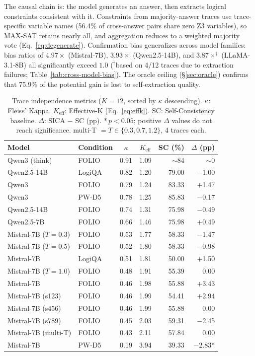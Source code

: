 The causal chain is: the model generates an answer, then extracts logical constraints consistent with it. Constraints from majority-answer traces use trace-specific variable names (56.4\% of cross-answer pairs share zero Z3 variables), so MAX-SAT retains nearly all, and aggregation reduces to a weighted majority vote (Eq.~\ref{eq:degenerate}). Confirmation bias generalizes across model families: bias ratios of $4.97\times$ (Mistral-7B), $3.93\times$ (Qwen2.5-14B), and $3.87{\times}^{\dag}$ (LLaMA-3.1-8B) all significantly exceed $1.0$ ($^{\dag}$based on 4/12 traces due to extraction failures; Table~\ref{tab:cross-model-bias}). The oracle ceiling (\S\ref{sec:oracle}) confirms that 75.9\% of the potential gain is lost to self-extraction quality.

\begin{table}[t]
\centering
\small
\caption{Trace independence metrics ($K = 12$, sorted by $\kappa$ descending). $\kappa$: Fleiss' Kappa. $K_{\text{eff}}$: Effective-K (Eq.~\ref{eq:effk}). SC: Self-Consistency baseline. $\Delta$: SICA $-$ SC (pp). {*}\,$p < 0.05$; positive $\Delta$ values do not reach significance. multi-T $= T \in \{0.3, 0.7, 1.2\}$, 4 traces each.}
\label{tab:independence}
\begin{tabular}{@{}llccrr@{}}
\toprule
Model & Condition & $\kappa$ & $K_{\text{eff}}$ & SC (\%) & $\Delta$ (pp) \\
\midrule
Qwen3 (think) & FOLIO & 0.91 & 1.09 & ${\sim}$84 & ${\sim}$0 \\
Qwen2.5-14B & LogiQA & 0.82 & 1.20 & 79.00 & $-$1.00 \\
Qwen3 & FOLIO & 0.79 & 1.24 & 83.33 & $+$1.47 \\
Qwen3 & PW-D5 & 0.78 & 1.25 & 85.83 & $-$0.17 \\
Qwen2.5-14B & FOLIO & 0.74 & 1.31 & 75.98 & $-$0.49 \\
Qwen2.5-7B & FOLIO & 0.66 & 1.46 & 75.98 & $+$0.49 \\
\addlinespace
Mistral-7B ($T{=}0.3$) & FOLIO & 0.53 & 1.77 & 58.33 & $-$1.47 \\
Mistral-7B ($T{=}0.5$) & FOLIO & 0.52 & 1.80 & 58.33 & $-$0.98 \\
Mistral-7B & LogiQA & 0.51 & 1.81 & 50.00 & $+$1.50 \\
Mistral-7B ($T{=}1.0$) & FOLIO & 0.48 & 1.91 & 55.39 & 0.00 \\
Mistral-7B & FOLIO & 0.46 & 1.98 & 55.88 & $+$3.43 \\
Mistral-7B (s123) & FOLIO & 0.46 & 1.99 & 54.41 & $+$2.94 \\
Mistral-7B (s456) & FOLIO & 0.46 & 1.99 & 55.88 & 0.00 \\
Mistral-7B (s789) & FOLIO & 0.45 & 2.03 & 59.31 & $-$2.45 \\
Mistral-7B (multi-T) & FOLIO & 0.43 & 2.11 & 57.84 & 0.00 \\
Mistral-7B & PW-D5 & 0.19 & 3.94 & 39.33 & $\mathbf{-2.83}${*} \\
\bottomrule
\end{tabular}
\end{table}


